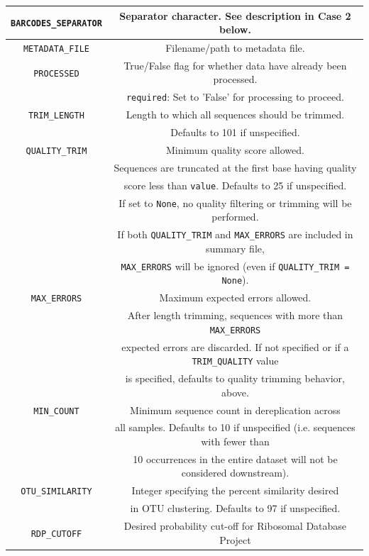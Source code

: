 \documentclass[11pt, oneside]{article}   	%
\begin{document}
\begin{table}[h!]
\begin{center}
\begin{tabular}{| c | c |}
       \hline
       {\tt BARCODES\_SEPARATOR} & Separator character.  See description in Case 2 below. \\
       \hline
       {\tt METADATA\_FILE} & Filename/path to metadata file. \\
       \hline
       {\tt PROCESSED} & True/False flag for whether data have already been processed. \\
        & {\tt required}: Set to 'False' for processing to proceed. \\
        \hline
        {\tt TRIM\_LENGTH} & Length to which all sequences should be trimmed.  \\
        & Defaults to 101 if unspecified. \\
        \hline
        {\tt QUALITY\_TRIM} & Minimum quality score allowed.  \\
        & Sequences are truncated at the first base having quality \\
        & score less than {\tt value}.  Defaults to 25 if unspecified. \\
        & If set to {\tt None}, no quality filtering or trimming will be performed. \\
        & If both {\tt QUALITY\_TRIM} and {\tt MAX\_ERRORS} are included in summary file, \\
        & {\tt MAX\_ERRORS} will be ignored (even if {\tt QUALITY\_TRIM = None}). \\
        \hline
		{\tt MAX\_ERRORS} & Maximum expected errors allowed. \\
		& After length trimming, sequences with more than {\tt MAX\_ERRORS} \\
		& expected errors are discarded. If not specified or if a {\tt TRIM\_QUALITY} value \\
		& is specified, defaults to quality trimming behavior, above. \\
		\hline
        {\tt MIN\_COUNT} & Minimum sequence count in dereplication across \\
        & all samples.  Defaults to 10 if unspecified (i.e. sequences with fewer than  \\
        & 10 occurrences in the entire dataset will not be considered downstream). \\
        \hline
        {\tt OTU\_SIMILARITY} & Integer specifying the percent similarity desired \\
         &  in OTU clustering.  Defaults to 97 if unspecified. \\
	\hline
	{\tt RDP\_CUTOFF} & Desired probability cut-off for Ribosomal Database Project \\

\end{tabular}
\end{center}
\end{table}
\end{document}
